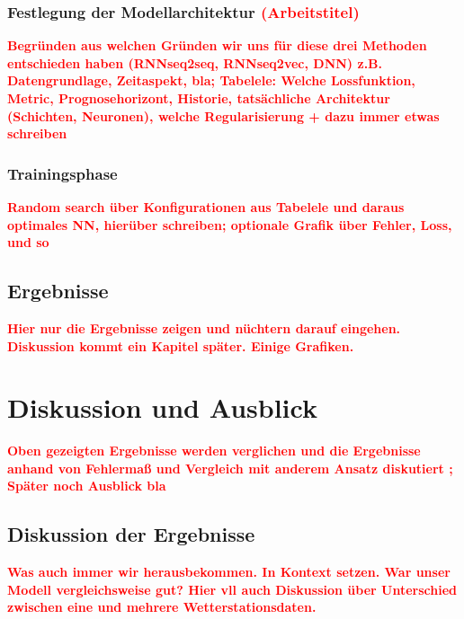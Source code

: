 \documentclass[
12pt, %
toc=listofnumbered, %
toc=chapterentrydotfill, %
numbers=noenddot, %
captions=tableheading, %
]{scrreprt}
\let\Oldsection\section
\renewcommand{\section}{\FloatBarrier\Oldsection}
\let\Oldsubsection\subsection
\renewcommand{\subsection}{\FloatBarrier\Oldsubsection}
\newcommand{\highlight}[1]{\textbf{\textcolor{red}{#1}}}
\begin{document}
\subsection{Festlegung der Modellarchitektur \highlight{(Arbeitstitel)}}
\highlight{Begründen aus welchen Gründen wir uns für diese drei Methoden entschieden haben 
(RNNseq2seq, RNNseq2vec, DNN) z.B. Datengrundlage, Zeitaspekt, bla; 
Tabelele: Welche Lossfunktion, Metric, Prognosehorizont, Historie, tatsächliche Architektur (Schichten, Neuronen), 
welche Regularisierung + dazu immer etwas schreiben }

\subsection{Trainingsphase}
\highlight{Random search über Konfigurationen aus Tabelele und daraus optimales NN, hierüber schreiben; 
optionale Grafik über Fehler, Loss, und so}

\section{Ergebnisse}
\highlight{Hier nur die Ergebnisse zeigen und nüchtern darauf eingehen. Diskussion kommt ein Kapitel später. Einige Grafiken.}


\chapter{Diskussion und Ausblick}
\highlight{Oben gezeigten Ergebnisse werden verglichen und die Ergebnisse anhand von Fehlermaß und Vergleich mit anderem Ansatz diskutiert ;
Später noch Ausblick bla}

\section{Diskussion der Ergebnisse}
\highlight{Was auch immer wir herausbekommen. In Kontext setzen. War unser Modell vergleichsweise gut? Hier vll auch 
Diskussion über Unterschied zwischen eine und mehrere Wetterstationsdaten.}
\end{document}
